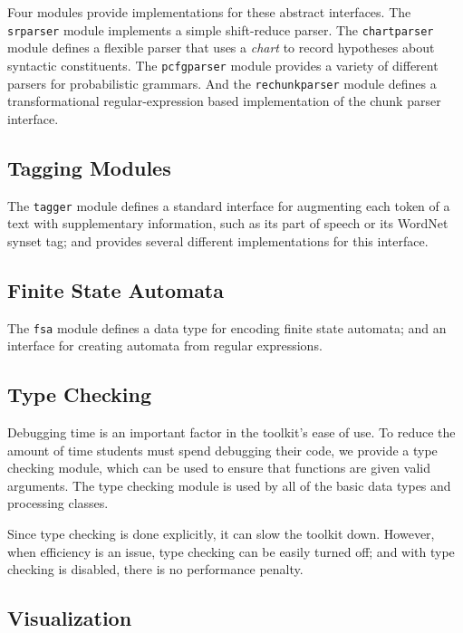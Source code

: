 \documentclass[11pt]{article}
\begin{document}
Four modules provide implementations for these abstract interfaces.
The \texttt{srparser} module implements a simple shift-reduce parser.
The \texttt{chartparser} module defines a flexible parser that uses a
\emph{chart} to record hypotheses about syntactic constituents.  The
\texttt{pcfgparser} module provides a variety of different parsers for
probabilistic grammars.  And the \texttt{rechunkparser} module defines
a transformational regular-expression based implementation of the
chunk parser interface.

\subsection*{Tagging Modules}

The \texttt{tagger} module defines a standard interface for augmenting
each token of a text with supplementary information, such as its part
of speech or its WordNet synset tag; and provides several different
implementations for this interface.

\subsection*{Finite State Automata}

The \texttt{fsa} module defines a data type for encoding finite state
automata; and an interface for creating automata from regular
expressions.

\subsection*{Type Checking}

Debugging time is an important factor in the toolkit's ease of use.
To reduce the amount of time students must spend debugging their code,
we provide a type checking module, which can be used to ensure that
functions are given valid arguments.  The type checking module is
used by all of the basic data types and processing classes.

Since type checking is done explicitly, it can slow the toolkit down.
However, when efficiency is an issue, type checking can be easily
turned off; and with type checking is disabled, there is no
performance penalty.

\subsection*{Visualization}
\end{document}
